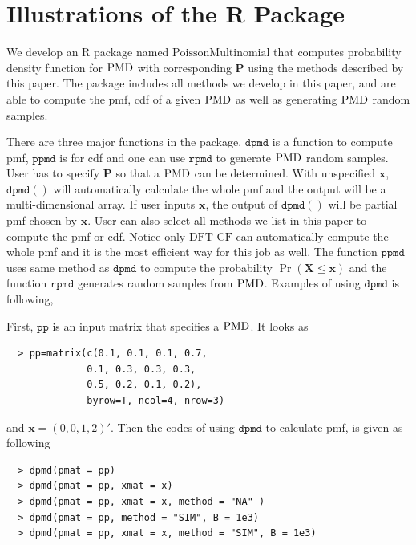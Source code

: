 \documentclass[12pt]{article}
\newcommand{\Pmat}{\mathbf{P}}
\newcommand{\PMD}{{\normalfont\textrm{PMD}}}
\newcommand{\Xvec}{\boldsymbol{X}}
\newcommand{\xvec}{\boldsymbol{x}}
\newcommand{\code}{\texttt}
\newcommand{\dft}{{\textrm{DFT-CF}}}
\begin{document}
\section{Illustrations of the R Package}\label{sec:rpackage}
We develop an R package named $\textrm{PoissonMultinomial}$ that computes probability density function for $\PMD$ with corresponding $\Pmat$ using the methods described by this paper. The package includes all methods we develop in this paper, and are able to compute the pmf, cdf of a given $\PMD$ as well as generating $\PMD$ random samples.

There are three major functions in the package. $\code{dpmd}$ is a function to compute pmf, $\code{ppmd}$ is for cdf and one can use $\code{rpmd}$ to generate $\PMD$ random samples. User has to specify $\Pmat$ so that a $\PMD$ can be determined. With unspecified $\xvec$, $\code{dpmd}( )$ will automatically calculate the whole pmf and the output will be a multi-dimensional array. If user inputs $\xvec$, the output of $\code{dpmd}( )$ will be partial pmf chosen by $\xvec$. User can also select all methods we list in this paper to compute the pmf or cdf. Notice only $\dft$ can automatically compute the whole pmf and it is the most efficient way for this job as well. The function $\code{ppmd}$ uses same method as $\code{dpmd}$ to compute the probability $\Pr(\Xvec \leq \xvec)$ and the function $\code{rpmd}$ generates random samples from $\PMD$.  Examples of using $\code{dpmd}$ is following,

First, $\code{pp}$ is an input matrix that specifies a $\PMD$. It looks as
\begin{verbatim}
  > pp=matrix(c(0.1, 0.1, 0.1, 0.7,
              0.1, 0.3, 0.3, 0.3,
              0.5, 0.2, 0.1, 0.2),
              byrow=T, ncol=4, nrow=3)
\end{verbatim}
and $\xvec=(0,0,1,2)'$. Then the codes of using $\code{dpmd}$ to calculate pmf, is given as following
\begin{verbatim}
  > dpmd(pmat = pp)
  > dpmd(pmat = pp, xmat = x)
  > dpmd(pmat = pp, xmat = x, method = "NA" )
  > dpmd(pmat = pp, method = "SIM", B = 1e3)
  > dpmd(pmat = pp, xmat = x, method = "SIM", B = 1e3)
\end{verbatim}
\end{document}

